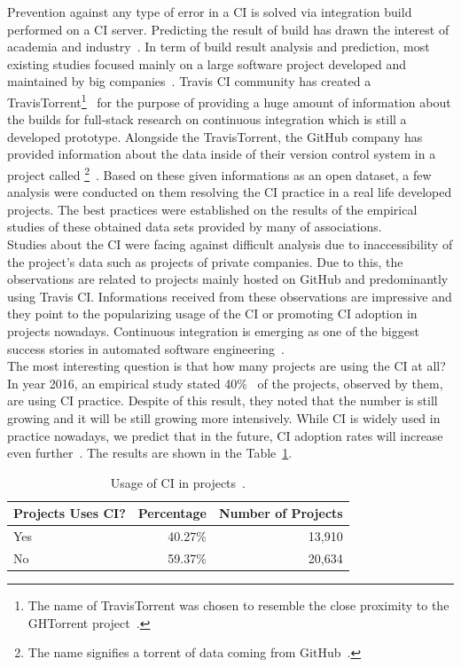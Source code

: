 Prevention against any type of error in a CI is solved via integration build performed on a CI server. Predicting the result of build has drawn the interest of academia and industry~\cite{ResultsOfCIbuild}. In term of build result analysis and prediction, most existing studies focused mainly on a large software project developed and maintained by big companies~\cite{ResultsOfCIbuild}. Travis CI community has created a TravisTorrent\footnote{The name of TravisTorrent was chosen to resemble the close proximity to the GHTorrent project~\cite{TravisTorrentWEBPAGE}.}~\cite{TravisTorrent} for the purpose of providing a huge amount of information about the builds for full-stack research on continuous integration which is still a developed prototype. Alongside the TravisTorrent, the GitHub company has provided information about the data inside of their version control system in a project called \footnote{The name signifies a torrent of data coming from GitHub~\cite{GHTorrentWEBPAGE}.}~\cite{GHTorrent}. Based on these given informations as an open dataset, a few analysis were conducted on them resolving the CI practice in a real life developed projects. The best practices were established on the results of the empirical studies of these obtained data sets provided by many of associations.\\

Studies about the CI were facing against difficult analysis due to inaccessibility of the project's data such as projects of private companies. Due to this, the observations are related to projects mainly hosted on GitHub and predominantly using Travis CI. Informations received from these observations are impressive and they point to the popularizing usage of the CI or promoting CI adoption in projects nowadays. Continuous integration is emerging as one of the biggest success stories in automated software engineering~\cite{COPE}.\\

The most interesting question is that how many projects are using the CI at all? In year 2016, an empirical study stated 40\%~\cite{COPE} of the projects, observed by them, are using CI practice. Despite of this result, they noted that the number is still growing and it will be still growing more intensively. While CI is widely used in practice nowadays, we predict that in the future, CI adoption rates will increase even further~\cite{COPE}. The results are shown in the Table~\ref{table:CI_usage}.

\begin{table}[H]
    \centering
    \begin{tabular}{lrr}
        \hline
        Projects Uses CI? & Percentage & Number of Projects \\
        \hline
        Yes               & 40.27\%    & 13,910             \\
        No                & 59.37\%    & 20,634             \\
        \hline
    \end{tabular}
    \caption{Usage of CI in projects~\cite{COPE}.}
    \label{table:CI_usage}
\end{table}

